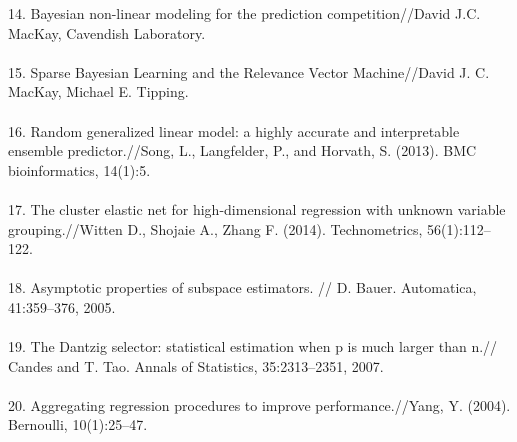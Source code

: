 \documentclass{article}
\begin{document}
14. Bayesian non-linear modeling for the prediction competition//David J.C. MacKay, Cavendish Laboratory. \\ \\
15. Sparse Bayesian Learning and the Relevance Vector Machine//David J. C. MacKay, Michael E. Tipping. \\ \\
16. Random generalized linear model: a highly accurate and interpretable ensemble predictor.//Song, L., Langfelder, P., and Horvath, S. (2013).  BMC bioinformatics, 14(1):5. \\ \\
17. The cluster elastic net for high-dimensional regression with unknown variable grouping.//Witten D., Shojaie A., Zhang F. (2014). Technometrics, 56(1):112–122. \\ \\
18. Asymptotic properties of subspace estimators. // D. Bauer. Automatica, 41:359–376, 2005. \\ \\
19. The Dantzig selector: statistical estimation when p is much larger than n.// Candes and T. Tao. Annals of Statistics, 35:2313–2351, 2007. \\ \\
20. Aggregating regression procedures to improve performance.//Yang, Y. (2004). Bernoulli, 10(1):25–47.
\end{document}
